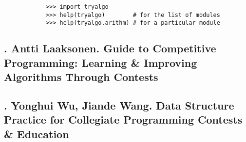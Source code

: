 \documentclass{article}
\begin{document}
\begin{itemize}
\begin{itemize}
		\begin{verbatim}
			>>> import tryalgo
			>>> help(tryalgo)		 # for the list of modules
			>>> help(tryalgo.arithm) # for a particular module
		\end{verbatim}
	\end{itemize}
\end{itemize}


\subsection{\cite{Laaksonen2020}. {\sc Antti Laaksonen}. Guide to Competitive Programming: Learning \& Improving Algorithms Through Contests}


\subsection{\cite{Wu_Wang2016}. {\sc Yonghui Wu, Jiande Wang}. Data Structure Practice for Collegiate Programming Contests \& Education}
\end{document}
